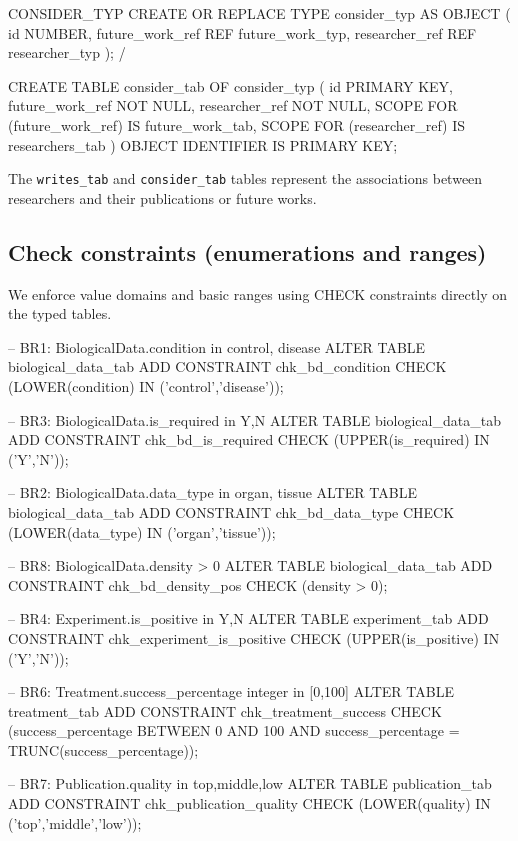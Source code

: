 \documentclass[11pt,a4paper]{article}
\begin{document}
\begin{sqlbox}{CONSIDER\_TYP}
CREATE OR REPLACE TYPE consider_typ AS OBJECT (
  id               NUMBER,
  future_work_ref  REF future_work_typ,
  researcher_ref   REF researcher_typ
);
/

CREATE TABLE consider_tab OF consider_typ (
  id PRIMARY KEY,
  future_work_ref NOT NULL,
  researcher_ref NOT NULL,
  SCOPE FOR (future_work_ref) IS future_work_tab,
  SCOPE FOR (researcher_ref) IS researchers_tab
) OBJECT IDENTIFIER IS PRIMARY KEY;
\end{sqlbox}

The \texttt{writes\_tab} and \texttt{consider\_tab} tables represent the associations between researchers and their publications or future works.

\subsection{Check constraints (enumerations and ranges)}

We enforce value domains and basic ranges using CHECK constraints directly on the typed tables.

\begin{sqlbox}[title={Enumerations and ranges (BR1, BR2, BR3, BR4, BR6, BR7, BR8)}]
-- BR1: BiologicalData.condition in {control, disease}
ALTER TABLE biological_data_tab
  ADD CONSTRAINT chk_bd_condition
  CHECK (LOWER(condition) IN ('control','disease'));

-- BR3: BiologicalData.is_required in {Y,N}
ALTER TABLE biological_data_tab
  ADD CONSTRAINT chk_bd_is_required
  CHECK (UPPER(is_required) IN ('Y','N'));

-- BR2: BiologicalData.data_type in {organ, tissue}
ALTER TABLE biological_data_tab
  ADD CONSTRAINT chk_bd_data_type
  CHECK (LOWER(data_type) IN ('organ','tissue'));

-- BR8: BiologicalData.density > 0
ALTER TABLE biological_data_tab
  ADD CONSTRAINT chk_bd_density_pos
  CHECK (density > 0);

-- BR4: Experiment.is_positive in {Y,N}
ALTER TABLE experiment_tab
  ADD CONSTRAINT chk_experiment_is_positive
  CHECK (UPPER(is_positive) IN ('Y','N'));

-- BR6: Treatment.success_percentage integer in [0,100]
ALTER TABLE treatment_tab
  ADD CONSTRAINT chk_treatment_success
  CHECK (success_percentage BETWEEN 0 AND 100 AND success_percentage = TRUNC(success_percentage));

-- BR7: Publication.quality in {top,middle,low}
ALTER TABLE publication_tab
  ADD CONSTRAINT chk_publication_quality
  CHECK (LOWER(quality) IN ('top','middle','low'));
\end{sqlbox}
\end{document}
